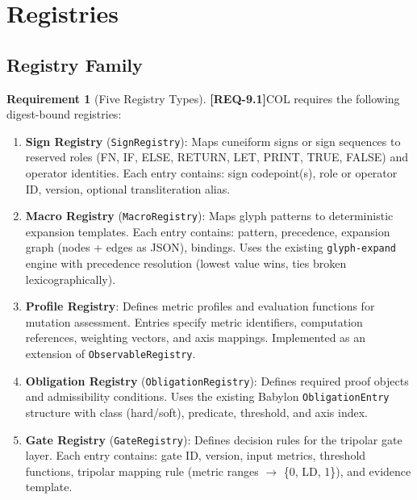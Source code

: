 \documentclass[11pt,a4paper,twoside]{article}
\theoremstyle{definition}
\newtheorem{requirement}{Requirement}[section]
\theoremstyle{remark}
\newcommand{\req}[1]{\textbf{\textcolor{reqred}{[REQ-#1]}}}
\begin{document}

\section{Registries}
\label{sec:registries}

\subsection{Registry Family}

\begin{requirement}[Five Registry Types]
\label{req:registries}
\req{9.1}\quad COL requires the following digest-bound registries:
\end{requirement}

\begin{enumerate}[label=\textbf{R\arabic*}]
  \item \textbf{Sign Registry} (\texttt{SignRegistry}): Maps cuneiform signs or sign sequences to reserved roles (FN, IF, ELSE, RETURN, LET, PRINT, TRUE, FALSE) and operator identities. Each entry contains: sign codepoint(s), role or operator ID, version, optional transliteration alias.

  \item \textbf{Macro Registry} (\texttt{MacroRegistry}): Maps glyph patterns to deterministic expansion templates. Each entry contains: pattern, precedence, expansion graph (nodes + edges as JSON), bindings. Uses the existing \texttt{glyph-expand} engine with precedence resolution (lowest value wins, ties broken lexicographically).

  \item \textbf{Profile Registry}: Defines metric profiles and evaluation functions for mutation assessment. Entries specify metric identifiers, computation references, weighting vectors, and axis mappings. Implemented as an extension of \texttt{ObservableRegistry}.

  \item \textbf{Obligation Registry} (\texttt{ObligationRegistry}): Defines required proof objects and admissibility conditions. Uses the existing Babylon \texttt{ObligationEntry} structure with class (hard/soft), predicate, threshold, and axis index.

  \item \textbf{Gate Registry} (\texttt{GateRegistry}): Defines decision rules for the tripolar gate layer. Each entry contains: gate ID, version, input metrics, threshold functions, tripolar mapping rule (metric ranges $\to$ \{0, LD, 1\}), and evidence template.
\end{enumerate}
\end{document}
